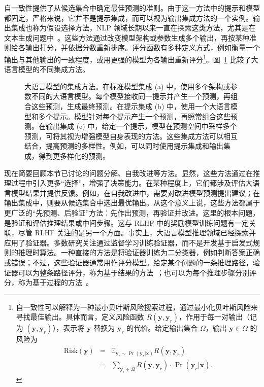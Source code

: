 自一致性提供了从候选集合中确定最佳预测的准则。由于这一方法中的提示和模型都固定，严格来说，它并不是提示集成，而可以视为输出集成方法的一个实例。输出集成也称为假设选择方法，NLP 领域长期以来一直在探索这类方法，尤其是在文本生成问题中~\cite{xiao-etal:2013bagging}。这些方法通过改变模型架构或参数生成多个输出，再按某种准则给各输出打分，并依据分数重新排序。评分函数有多种定义方式，例如衡量一个输出与其他输出的一致程度，或用更强的模型为各输出重新评分\footnote{自一致性可以解释为一种最小贝叶斯风险搜索过程，通过最小化贝叶斯风险来寻找最佳输出。具体而言，定义风险函数 $R(\mathbf{y},\mathbf{y}_r)$，作用于每一对输出（记为 $(\mathbf{y},\mathbf{y}_r)$），表示将 $\mathbf{y}$ 替换为 $\mathbf{y}_r$ 的代价。给定输出集合 $\varOmega$，输出 $\mathbf{y} \in \varOmega$ 的风险为
\begin{eqnarray}
\mathrm{Risk}(\mathbf{y}) & = & \mathbb{E}_{\mathbf{y}_r \sim \Pr(\mathbf{y}_r|\mathbf{x})} R(\mathbf{y},\mathbf{y}_r) \nonumber \\
                          & = & \sum_{\mathbf{y}_r \in \varOmega} R(\mathbf{y},\mathbf{y}_r) \cdot \Pr(\mathbf{y}_r|\mathbf{x}).
\end{eqnarray}

}。图~\ref{fig:llm-ensembling-comparison} 比较了大语言模型的不同集成方法。

\begin{figure}[!t]
\centering

\caption{大语言模型的集成方法。在标准模型集成 (a) 中，使用多个架构或参数不同的大语言模型。每个模型接收同一提示并产生一个预测，再组合这些预测，生成最终预测。在提示集成 (b) 中，使用一个大语言模型和多个提示。模型针对每个提示产生一个预测，再照常组合这些预测。在输出集成 (c) 中，给定一个提示，模型在预测空间中采样多个预测，可将其视为增强模型自身表现的方法。这些集成方法可以相互结合，提高预测的多样性。例如，可以同时使用提示集成和输出集成，得到更多样化的预测。}
\label{fig:llm-ensembling-comparison}
\end{figure}

现在简要回顾本节已讨论的问题分解、自我改进等方法。显然，这些方法通过在推理过程中引入更多“选择”，增强了决策能力。在某种程度上，它们都涉及评估大语言模型结果并提供反馈。例如，在自我改进中，需要对改进模型预测提出建议；在输出集成中，则要从候选集合中选出最优输出。从这个意义上说，这些方法都属于更广泛的“先预测、后验证”方法：先作出预测，再验证并改进。这里的根本问题，是验证和评估推理结果或中间步骤。这与 RLHF 中的奖励模型训练问题有一定关联，尽管 RLHF 关注的是另一个方面。事实上，大语言模型推理领域已经探索并应用了验证器。多数研究关注通过监督学习训练验证器，而不是开发基于启发式规则的推理时算法。一种直接的方法是将验证器训练为二分类器，例如判断答案正确或错误；不过，这些验证器通常用作评分模型。给定某个问题的一条推理路径，验证器可以为整条路径评分，称为基于结果的方法~\cite{cobbe-etal:2021training}；也可以为每个推理步骤分别评分，称为基于过程的方法~\cite{uesato-etal:2022solving,lightman-etal:2024lets}。

